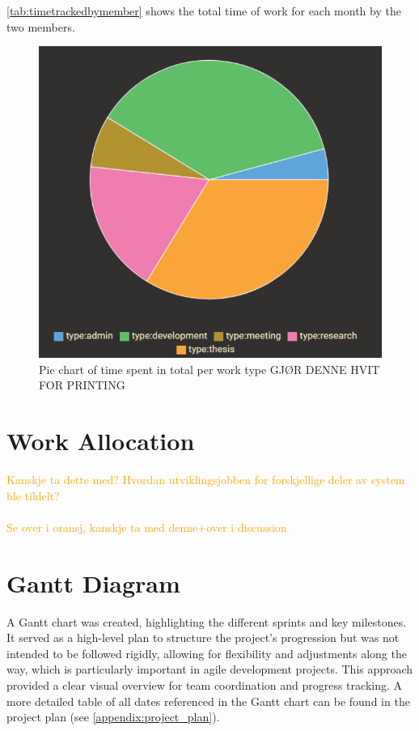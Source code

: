 \autoref{tab:timetrackedbymember} shows the total time of work for each month by the two members.

\begin{figure}[h]
    \centering
    \includegraphics[width=0.5\linewidth]{figures/time_tracking_by_type.pdf}
    \caption{Pie chart of time spent in total per work type GJØR DENNE HVIT FOR PRINTING}
    \label{fig:time_tracking_by_type}
\end{figure}


\section{Work Allocation}

\textcolor{orange}{Kanskje ta dette med? Hvordan utviklingsjobben for forskjellige deler av system ble tildelt? \\ \\
Se over i oransj, kanskje ta med denne+over i discussion}

\section{Gantt Diagram}

A Gantt chart was created, highlighting the different sprints and key milestones. It served as a high-level plan to structure the project's progression but was not intended to be followed rigidly, allowing for flexibility and adjustments along the way, which is particularly important in agile development projects. This approach provided a clear visual overview for team coordination and progress tracking. A more detailed table of all dates referenced in the Gantt chart can be found in the project plan (see \autoref{appendix:project_plan}).

